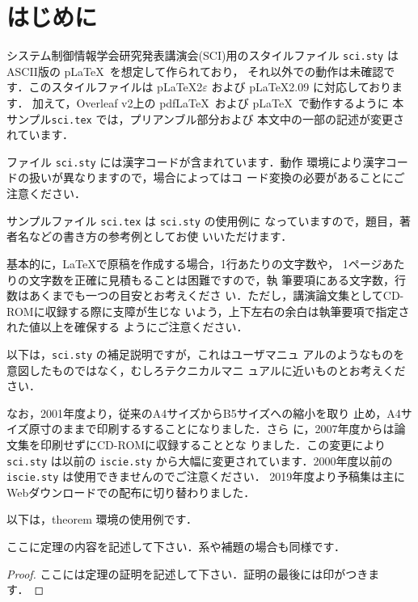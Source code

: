\documentclass{jarticle}
\begin{document}
\maketitle

\section{はじめに}

システム制御情報学会研究発表講演会(SCI)用のスタイルファイル 
\verb+sci.sty+ は ASCII版の p\LaTeX\ を想定して作られており，
それ以外での動作は未確認です．このスタイルファイルは 
p\LaTeX2$\varepsilon$ および p\LaTeX 2.09 に対応しております．
%
加えて，Overleaf v2上の pdf\LaTeX\ および p\LaTeX\ で動作するように
本サンプル\verb+sci.tex+ では，プリアンブル部分および
本文中の一部の記述が変更されています．

ファイル \verb+sci.sty+ には漢字コードが含まれています．動作
環境により漢字コードの扱いが異なりますので，場合によってはコ
ード変換の必要があることにご注意ください．

サンプルファイル \verb+sci.tex+ は \verb+sci.sty+ の使用例に
なっていますので，題目，著者名などの書き方の参考例としてお使
いいただけます．

基本的に，\LaTeX で原稿を作成する場合，1行あたりの文字数や，
1ページあたりの文字数を正確に見積もることは困難ですので，執
筆要項にある文字数，行数はあくまでも一つの目安とお考えくださ
い．ただし，講演論文集としてCD-ROMに収録する際に支障が生じな
いよう，上下左右の余白は執筆要項で指定された値以上を確保する
ようにご注意ください．

以下は，\verb+sci.sty+ の補足説明ですが，これはユーザマニュ
アルのようなものを意図したものではなく，むしろテクニカルマニ
ュアルに近いものとお考えください．

なお，2001年度より，従来のA4サイズからB5サイズへの縮小を取り
止め，A4サイズ原寸のままで印刷するすることになりました．さら
に，2007年度からは論文集を印刷せずにCD-ROMに収録することとな
りました．この変更により \verb+sci.sty+ は以前の
\verb+iscie.sty+ から大幅に変更されています．2000年度以前の 
\verb+iscie.sty+ は使用できませんのでご注意ください．
%
2019年度より予稿集は主にWebダウンロードでの配布に切り替わりました．

以下は，theorem 環境の使用例です．

\begin{theorem}
ここに定理の内容を記述して下さい．系や補題の場合も同様です．
\end{theorem}
\begin{proof}
ここには定理の証明を記述して下さい．証明の最後には印がつきま
す．
\end{proof}
\end{document}
